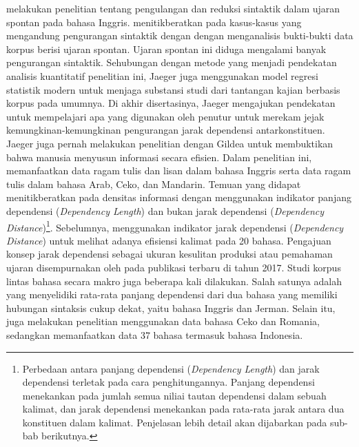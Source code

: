 \cite{jaeger2006redundancy} melakukan penelitian tentang pengulangan dan reduksi sintaktik dalam ujaran spontan pada bahasa Inggris. \cite{jaeger2006redundancy}  menitikberatkan pada kasus-kasus yang mengandung pengurangan sintaktik dengan dengan menganalisis bukti-bukti data korpus berisi ujaran spontan. Ujaran spontan ini diduga mengalami banyak pengurangan sintaktik. Sehubungan dengan metode yang menjadi pendekatan analisis kuantitatif penelitian ini, Jaeger juga menggunakan model regresi statistik modern untuk menjaga substansi studi dari tantangan kajian berbasis korpus pada umumnya. Di akhir disertasinya, Jaeger mengajukan pendekatan untuk mempelajari apa yang digunakan oleh penutur untuk merekam jejak kemungkinan-kemungkinan pengurangan jarak dependensi antarkonstituen. Jaeger juga pernah melakukan penelitian dengan Gildea \citep{gildea2015human} untuk membuktikan bahwa manusia menyusun informasi secara efisien. Dalam penelitian ini, \cite{gildea2015human} memanfaatkan data ragam tulis dan lisan dalam bahasa Inggris serta data ragam tulis dalam bahasa Arab, Ceko, dan Mandarin. Temuan yang didapat menitikberatkan pada densitas informasi dengan menggunakan indikator panjang dependensi (\textit{Dependency Length}) dan bukan jarak dependensi (\textit{Dependency Distance})\footnote{Perbedaan antara panjang dependensi (\textit{Dependency Length}) dan jarak dependensi terletak pada cara penghitungannya. Panjang dependensi menekankan pada jumlah semua niliai tautan dependensi dalam sebuah kalimat, dan jarak dependensi menekankan pada rata-rata jarak antara dua konstituen dalam kalimat. Penjelasan lebih detail akan dijabarkan pada sub-bab berikutnya.}. Sebelumnya, \cite{liu2008dependency} menggunakan indikator jarak dependensi (\textit{Dependency Distance}) untuk melihat adanya efisiensi kalimat pada 20 bahasa. Pengajuan konsep jarak dependensi sebagai ukuran kesulitan produksi atau pemahaman ujaran disempurnakan oleh \cite{liu2017dependency} pada publikasi terbaru di tahun 2017. Studi korpus lintas bahasa secara makro juga beberapa kali dilakukan. Salah satunya adalah \cite{gildea2010grammars} yang menyelidiki rata-rata panjang dependensi dari dua bahasa yang memiliki hubungan sintaksis cukup dekat, yaitu bahasa Inggris dan Jerman. Selain itu, \cite{i2004euclidean} juga melakukan penelitian menggunakan data bahasa Ceko dan Romania, sedangkan \cite{futrell2015large} memanfaatkan data 37 bahasa termasuk bahasa Indonesia.

